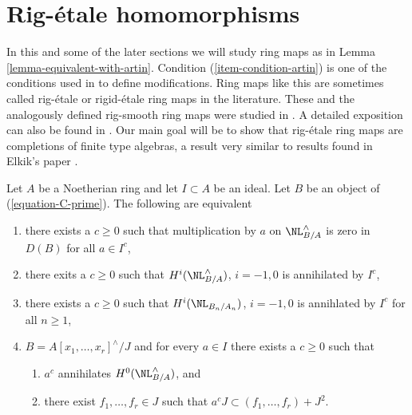 \section{Rig-\'etale homomorphisms}
\label{section-rig-etale}

\noindent
In this and some of the later sections we will study ring maps as
in Lemma \ref{lemma-equivalent-with-artin}. Condition
(\ref{item-condition-artin}) is one of the conditions used in
\cite{ArtinII} to define modifications. Ring maps like this are sometimes
called rig-\'etale or rigid-\'etale ring maps in the literature. These and
the analogously defined rig-smooth ring maps were studied
in \cite{Elkik}. A detailed exposition can also be found in
\cite{Abbes}. Our main goal will be to show that rig-\'etale
ring maps are completions of finite type algebras, a result
very similar to results found in Elkik's paper \cite{Elkik}.

\begin{lemma}
\label{lemma-equivalent-with-artin}
Let $A$ be a Noetherian ring and let $I \subset A$ be an ideal.
Let $B$ be an object of (\ref{equation-C-prime}). The following are equivalent
\begin{enumerate}
\item
\label{item-zero-on-NL}
there exists a $c \geq 0$ such that multiplication by $a$
on $\NL^\wedge_{B/A}$ is zero in $D(B)$ for all $a \in I^c$,
\item
\label{item-zero-on-cohomology-NL}
there exits a $c \geq 0$ such that $H^i(\NL^\wedge_{B/A})$, $i = -1, 0$ is
annihilated by $I^c$,
\item
\label{item-zero-on-cohomology-NL-truncations}
there exists a $c \geq 0$ such that $H^i(\NL_{B_n/A_n})$, $i = -1, 0$ is
annihlated by $I^c$ for all $n \geq 1$,
\item
\label{item-condition-artin}
$B = A[x_1, \ldots, x_r]^\wedge/J$ and
for every $a \in I$ there exists a $c \geq 0$ such that
\begin{enumerate}
\item $a^c$ annihilates $H^0(\NL^\wedge_{B/A})$, and
\item there exist $f_1, \ldots, f_r \in J$ such that
$a^c J \subset (f_1, \ldots, f_r) + J^2$.
\end{enumerate}
\end{enumerate}
\end{lemma}

